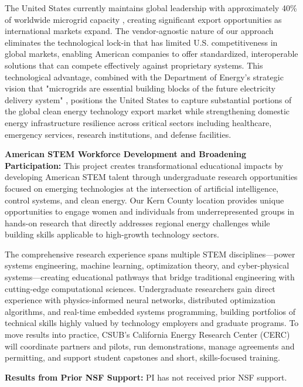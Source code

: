 \documentclass[12pt]{article}
\begin{document}
The United States currently maintains global leadership with approximately 40\% of worldwide microgrid capacity \cite{chen2018review}, creating significant export opportunities as international markets expand. The vendor-agnostic nature of our approach eliminates the technological lock-in that has limited U.S. competitiveness in global markets, enabling American companies to offer standardized, interoperable solutions that can compete effectively against proprietary systems. This technological advantage, combined with the Department of Energy's strategic vision that "microgrids are essential building blocks of the future electricity delivery system" \cite{doe2022strategy}, positions the United States to capture substantial portions of the global clean energy technology export market while strengthening domestic energy infrastructure resilience across critical sectors including healthcare, emergency services, research institutions, and defense facilities.

\textbf{American STEM Workforce Development and Broadening Participation:} This project creates transformational educational impacts by developing American STEM talent through undergraduate research opportunities focused on emerging technologies at the intersection of artificial intelligence, control systems, and clean energy. Our Kern County location provides unique opportunities to engage women and individuals from underrepresented groups in hands-on research that directly addresses regional energy challenges while building skills applicable to high-growth technology sectors.

The comprehensive research experience spans multiple STEM disciplines---power systems engineering, machine learning, optimization theory, and cyber-physical systems---creating educational pathways that bridge traditional engineering with cutting-edge computational sciences. Undergraduate researchers gain direct experience with physics-informed neural networks, distributed optimization algorithms, and real-time embedded systems programming, building portfolios of technical skills highly valued by technology employers and graduate programs. To move results into practice, CSUB's California Energy Research Center (CERC) will coordinate partners and pilots, run demonstrations, manage agreements and permitting, and support student capstones and short, skills-focused training.

\vspace{.2cm}
\noindent\textbf{Results from Prior NSF Support:} PI has not received prior NSF support.



\end{document}
